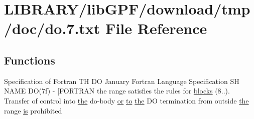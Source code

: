 \hypertarget{do_87_8txt}{}\section{L\+I\+B\+R\+A\+R\+Y/lib\+G\+P\+F/download/tmp/doc/do.7.txt File Reference}
\label{do_87_8txt}
\subsection*{Functions}
\begin{DoxyCompactItemize}
\item 
Specification of Fortran TH DO January Fortran Language Specification SH N\+A\+ME DO(7f) -\/ \mbox{[}\+F\+O\+R\+T\+R\+A\+N the range satisfies the rules for \hyperlink{do_87_8txt_addf9a264ccc8c65a4995cf34906eff5c}{blocks} (8..). Transfer of control into \hyperlink{M__stopwatch_83_8txt_a0f266597de2e57eb3aa964927bb30e14}{the} do-\/body \hyperlink{what__overview_81_8txt_a93f5d39a36ed511cc0dc88a20a517388}{or} \hyperlink{M__stopwatch_83_8txt_a97209fd3e34ef701c0a9734280779cbb}{to} \hyperlink{M__stopwatch_83_8txt_a0f266597de2e57eb3aa964927bb30e14}{the} DO termination from outside \hyperlink{M__stopwatch_83_8txt_a0f266597de2e57eb3aa964927bb30e14}{the} range \hyperlink{intro__blas1_83_8txt_a42a91df93f840595de3019ceb5d1df23}{is} prohibited
\item 

\end{DoxyCompactItemize}
